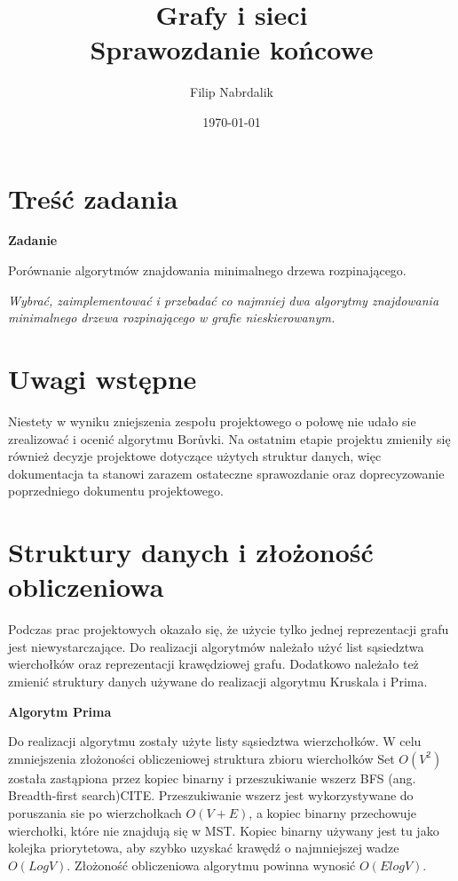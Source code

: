 \documentclass[a4paper, 10pt]{article}
\title{{\bf {Grafy i sieci}} \\ {\large Sprawozdanie końcowe}}
\date{\today}
\author{Filip Nabrdalik}
\begin{document}




\maketitle 




\newcommand{\ang}[1]{(ang.  #1\/)}
\newcommand{\e}[1]{{\em #1}\/}

\renewcommand*{\figurename}{Wykres}



\section{Treść zadania}

{\bf{Zadanie}}

Porównanie algorytmów znajdowania minimalnego drzewa rozpinającego.

{\it Wybrać, zaimplementować i przebadać co najmniej dwa algorytmy znajdowania minimalnego drzewa rozpinającego w grafie nieskierowanym. }

 

\section{Uwagi wstępne}

Niestety w wyniku zniejszenia zespołu projektowego o połowę nie udało sie zrealizować i ocenić algorytmu Borůvki. 
Na ostatnim etapie projektu zmieniły się również decyzje projektowe dotyczące użytych struktur danych, więc 
dokumentacja ta stanowi zarazem ostateczne sprawozdanie oraz doprecyzowanie poprzedniego dokumentu projektowego.



\section{Struktury danych i złożoność obliczeniowa}

Podczas prac projektowych okazało się, że użycie tylko jednej reprezentacji grafu jest niewystarczające. Do realizacji algorytmów należało użyć
list sąsiedztwa wierchołków oraz reprezentacji krawędziowej grafu. Dodatkowo należało też zmienić struktury danych używane do realizacji algorytmu Kruskala
i Prima.


{\bf{Algorytm Prima}}
 
 Do realizacji algorytmu zostały użyte listy sąsiedztwa wierzchołków.
 W celu zmniejszenia złożoności obliczeniowej struktura zbioru wierchołków Set $O(V^2)$ została zastąpiona
 przez kopiec binarny i przeszukiwanie wszerz BFS \ang{Breadth-first search}CITE. Przeszukiwanie wszerz jest wykorzystywane do
 poruszania sie po wierzchołkach $O(V+E)$, a kopiec binarny przechowuje wierchołki, które nie znajdują się w MST. Kopiec binarny używany 
 jest tu jako kolejka priorytetowa, aby szybko uzyskać krawędź o najmniejszej wadze $O(LogV)$. Złożoność obliczeniowa algorytmu powinna wynosić
 $O(ElogV)$.
 
\end{document}
